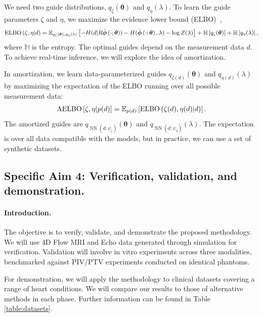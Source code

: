 We need two guide distributions, $q_{\zeta}\left(\boldsymbol{\theta}\right)$ and $q_{\eta}\left(\lambda\right)$.
To learn the guide parameters $\zeta$ and $\eta$, we maximize the evidence lower bound (ELBO)~\cite{2013arXiv1312.6114K},
\begin{align*}
\small
    \operatorname{ELBO}
    \left(
    \zeta, \eta \middle\vert d 
    \right)
    =
    \mathbb{E}_{q_{\zeta}(\boldsymbol{\theta}), q_{\eta}(\lambda)}
    \left[
    -H(d|R\hat{\boldsymbol{\phi}}\left(\cdot;\boldsymbol{\theta}\right))
    - 
    H(\hat{\boldsymbol{\phi}}\left(\cdot;\boldsymbol{\theta}\right), \lambda)
    - \log Z(\lambda)
    \right]
    +
    \mathbb{H}\left[
    q_{\zeta}(\boldsymbol{\theta})
    \right]
    +
    \mathbb{H}\left[
    q_{\eta}(\lambda)
    \right],
\end{align*}
where $\mathbb{H}$ is the entropy.
The optimal guides depend on the measurement data $d$.
To achieve real-time inference, we will explore the idea of amortization.

In amortization, we learn data-parameterized guides $q_{\zeta(d)}(\boldsymbol{\theta})$ and $q_{\eta(d)}(\lambda)$ by maximizing the expectation of the ELBO running over all possible measurement data:
\begin{align*}
\small
    \operatorname{AELBO}
    \left[
    \zeta, \eta\middle\vert p(d)
    \right]
    =
    \mathbb{E}_{p(d)}
    \left[
     \operatorname{ELBO}
    \left(
    \zeta(d), 
    \eta(d)
    \middle\vert d 
    \right)
    \right].
\end{align*}
The amortized guides are $q_{\operatorname{NN}(d;\psi_{\zeta})}(\boldsymbol{\theta})$ and
$q_{\operatorname{NN}(d;\psi_{\eta})}(\lambda)$.
The expectation is over all data compatible with the models, but in practice, we can use a set of synthetic datasets.

\subsection*{Specific Aim 4: Verification, validation, and demonstration.}
\paragraph{Introduction.}
The objective is to verify, validate, and demonstrate the proposed methodology. 
We will use 4D Flow MRI and Echo data generated through simulation for verification. 
Validation will involve in vitro experiments across three modalities, benchmarked against PIV/PTV experiments conducted on identical phantoms. 

For demonstration, we will apply the methodology to clinical datasets covering a range of heart conditions. 
We will compare our results to those of alternative methods in each phase. 
Further information can be found in Table \ref{table:datasets}.

